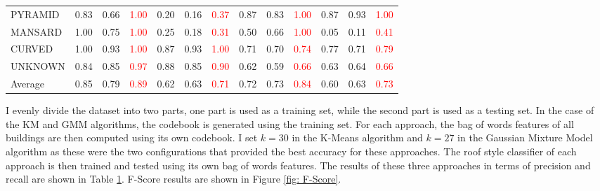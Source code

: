 \documentclass{iitthesis}
\begin{document}
\begin{table}[t]
{\begin{tabular}{ccccccccccccc}
\multicolumn{1}{l}{{PYRAMID}} & 
\multicolumn{1}{c}{0.83} & 0.66 & \textcolor{red}{1.00} & 
0.20 & 0.16 & \textcolor{red}{0.37} & 
0.87 & 0.83 & \textcolor{red}{1.00} & 
0.87 & 0.93 & \textcolor{red}{1.00}\\


\multicolumn{1}{l}{{MANSARD}} & 
\multicolumn{1}{c}{1.00} & 0.75 & \textcolor{red}{1.00} & 
0.25 & 0.18 & \textcolor{red}{0.31} & 
0.50 & 0.66 & \textcolor{red}{1.00} & 
0.05 & 0.11 & \textcolor{red}{0.41}\\


\multicolumn{1}{l}{{CURVED}} & 
\multicolumn{1}{c}{1.00} & 0.93 & \textcolor{red}{1.00} & 
0.87 & 0.93 & \textcolor{red}{1.00} & 
0.71 & 0.70 & \textcolor{red}{0.74} & 
0.77 & 0.71 & \textcolor{red}{0.79}\\


\multicolumn{1}{l}{{UNKNOWN}} & 
\multicolumn{1}{c}{0.84} & 0.85 & \textcolor{red}{0.97} & 
0.88 & 0.85 & \textcolor{red}{0.90} & 
0.62 & 0.59 & \textcolor{red}{0.66} & 
0.63 & 0.64 & \textcolor{red}{0.66}\\


\multicolumn{1}{l}{{Average}} & 
\multicolumn{1}{c}{0.85} & 0.79 & \textcolor{red}{0.89} & 
0.62 & 0.63 & \textcolor{red}{0.71} & 
0.72 & 0.73 & \textcolor{red}{0.84} & 
0.60 & 0.63 & \textcolor{red}{0.73}\\
\hline

\end{tabular}
}
\label{table: pr}
\end{table}

I evenly divide the dataset into two parts, one part is used as a training set, while the second part is used as a testing set. In the case of the KM and GMM algorithms, the codebook is generated using the training set. For each approach, the bag of words features of all buildings are then computed using its own codebook. I set $k=30$ in the K-Means algorithm and $k=27$ in the Gaussian Mixture Model algorithm as these were the two configurations that provided the best accuracy for these approaches. The roof style classifier of each approach is then trained and tested using its own bag of words features. The results of these three approaches in terms of precision and recall are shown in Table \ref{table: pr}. F-Score results are shown in Figure \ref{fig: F-Score}. 
\end{document}
